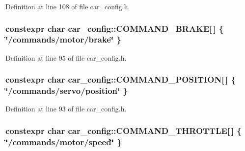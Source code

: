Definition at line 108 of file car\+\_\+config.\+h.

\subsubsection[{\texorpdfstring{C\+O\+M\+M\+A\+N\+D\+\_\+\+B\+R\+A\+KE}{COMMAND_BRAKE}}]{\setlength{\rightskip}{0pt plus 5cm}constexpr char car\+\_\+config\+::\+C\+O\+M\+M\+A\+N\+D\+\_\+\+B\+R\+A\+KE\mbox{[}$\,$\mbox{]} \{ \char`\"{}/commands/motor/brake\char`\"{} \}}\hypertarget{namespacecar__config_ab3b957004ca9df19d509c984937723f7}{}\label{namespacecar__config_ab3b957004ca9df19d509c984937723f7}


Definition at line 95 of file car\+\_\+config.\+h.

\subsubsection[{\texorpdfstring{C\+O\+M\+M\+A\+N\+D\+\_\+\+P\+O\+S\+I\+T\+I\+ON}{COMMAND_POSITION}}]{\setlength{\rightskip}{0pt plus 5cm}constexpr char car\+\_\+config\+::\+C\+O\+M\+M\+A\+N\+D\+\_\+\+P\+O\+S\+I\+T\+I\+ON\mbox{[}$\,$\mbox{]} \{ \char`\"{}/commands/servo/position\char`\"{} \}}\hypertarget{namespacecar__config_a6008524bf1090f0ab0c994b2f80dcb22}{}\label{namespacecar__config_a6008524bf1090f0ab0c994b2f80dcb22}


Definition at line 93 of file car\+\_\+config.\+h.

\subsubsection[{\texorpdfstring{C\+O\+M\+M\+A\+N\+D\+\_\+\+T\+H\+R\+O\+T\+T\+LE}{COMMAND_THROTTLE}}]{\setlength{\rightskip}{0pt plus 5cm}constexpr char car\+\_\+config\+::\+C\+O\+M\+M\+A\+N\+D\+\_\+\+T\+H\+R\+O\+T\+T\+LE\mbox{[}$\,$\mbox{]} \{ \char`\"{}/commands/motor/speed\char`\"{} \}}\hypertarget{namespacecar__config_afdb192c52a9126c0bedf2ca4a7c99c2a}{}\label{namespacecar__config_afdb192c52a9126c0bedf2ca4a7c99c2a}


